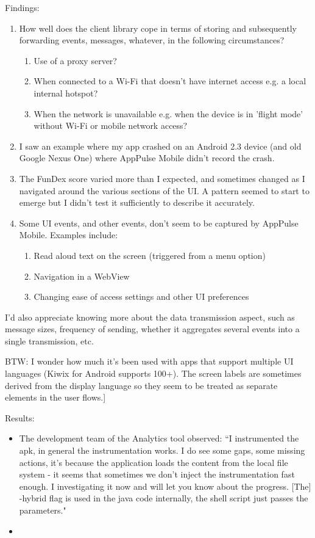 Findings: 
\begin{enumerate}
    \item How well does the client library cope in terms of storing and subsequently forwarding events, messages, whatever, in the following circumstances?
    \begin{enumerate}
        \item Use of a proxy server?
        \item When connected to a Wi-Fi that doesn't have internet access e.g. a local internal hotspot?
        \item When the network is unavailable e.g. when the device is in 'flight mode' without Wi-Fi or mobile network access?
    \end{enumerate}
    \item I saw an example where my app crashed on an Android 2.3 device (and old Google Nexus One) where AppPulse Mobile didn't record the crash.
    \item The FunDex score varied more than I expected, and sometimes changed as I navigated around the various sections of the UI. A pattern seemed to start to emerge but I didn't test it sufficiently to describe it accurately.
    \item Some UI events, and other events, don't seem to be captured by AppPulse Mobile. Examples include:
    \begin{enumerate}
        \item Read aloud text on the screen (triggered from a menu option)
        \item Navigation in a WebView
        \item Changing ease of access settings and other UI preferences
    \end{enumerate}
\end{enumerate}

I'd also appreciate knowing more about the data transmission aspect, such as message sizes, frequency of sending, whether it aggregates several events into a single transmission, etc.

BTW: I wonder how much it's been used with apps that support multiple UI languages (Kiwix for Android supports 100+). The screen labels are sometimes derived from the display language so they seem to be treated as separate elements in the user flows.]

Results:
\begin{itemize}
    \item The development team of the Analytics tool observed: ``I instrumented the apk, in general the instrumentation works. I do see some gaps, some missing actions, it’s because the application loads the content from the local file system - it seems that sometimes we don’t inject the instrumentation fast enough. I investigating it now and will let you know about the progress. [The] -hybrid flag is used in the java code internally, the shell script just passes the parameters." %
    \item 
\end{itemize}

